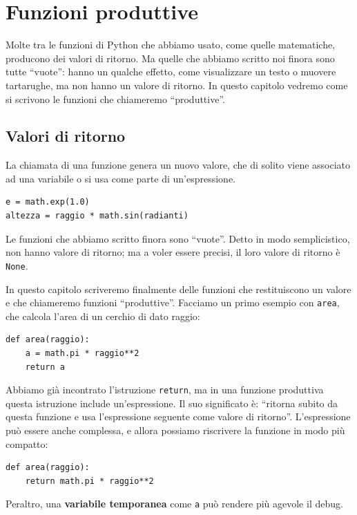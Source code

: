 \documentclass[10pt]{book}
\begin{document}
\chapter{Funzioni produttive}
\label{fruitchap}

Molte tra le funzioni di Python che abbiamo usato, come quelle matematiche, producono dei valori di ritorno. Ma quelle che abbiamo scritto noi finora sono tutte ``vuote'': hanno un qualche effetto, come visualizzare un testo o muovere tartarughe, ma non hanno un valore di ritorno. In questo capitolo vedremo come si scrivono le funzioni che chiameremo ``produttive''.

\section{Valori di ritorno}

La chiamata di una funzione genera un nuovo valore, che di solito viene associato ad una variabile o si usa come parte di un'espressione.

\begin{verbatim}
e = math.exp(1.0)
altezza = raggio * math.sin(radianti)
\end{verbatim}
%
Le funzioni che abbiamo scritto finora sono ``vuote''. Detto in modo semplicistico, non hanno valore di ritorno; ma a voler essere precisi, il loro valore di ritorno è {\tt None}.

In questo capitolo scriveremo finalmente delle funzioni che restituiscono un valore e che chiameremo funzioni ``produttive''.
Facciamo un primo esempio con {\tt area}, che calcola l'area di un cerchio di dato raggio:

\begin{verbatim}
def area(raggio):
    a = math.pi * raggio**2
    return a
\end{verbatim}
%
Abbiamo già incontrato l'istruzione {\tt return}, ma in una funzione produttiva questa istruzione include un'espressione. Il suo significato è: ``ritorna subito da questa funzione e usa l'espressione seguente come valore di ritorno''. L'espressione può essere anche complessa, e allora possiamo riscrivere la funzione in modo più compatto:

\begin{verbatim}
def area(raggio):
    return math.pi * raggio**2
\end{verbatim}
%
Peraltro, una {\bf variabile temporanea} come {\tt a} può rendere più agevole il debug.
\end{document}
